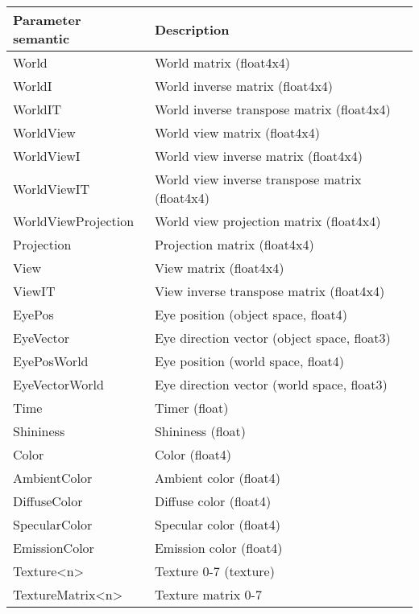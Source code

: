 \begin{tabular}{|p{7cm}|p{7cm}|}
\hline
\textbf{Parameter semantic} & \textbf{Description}\\
\hline
World               & World matrix (float4x4)\\
\hline
WorldI	            & World inverse matrix (float4x4)\\
\hline
WorldIT	            & World inverse transpose matrix (float4x4)\\
\hline
WorldView           & World view matrix (float4x4)\\
\hline
WorldViewI          & World view inverse matrix (float4x4)\\
\hline
WorldViewIT         & World view inverse transpose matrix (float4x4)\\
\hline
WorldViewProjection & World view projection matrix (float4x4)\\
\hline
Projection	        & Projection matrix (float4x4)\\
\hline
View	            & View matrix (float4x4)\\
\hline
ViewIT	            & View inverse transpose matrix (float4x4)\\
\hline
EyePos	            & Eye position (object space, float4)\\
\hline
EyeVector           & Eye direction vector (object space, float3)\\
\hline
EyePosWorld	        & Eye position (world space, float4)\\
\hline
EyeVectorWorld      & Eye direction vector (world space, float3)\\
\hline
Time	            & Timer (float)\\
\hline
Shininess	        & Shininess (float)\\
\hline
Color	            & Color (float4)\\
\hline
AmbientColor        & Ambient color (float4)\\
\hline
DiffuseColor        & Diffuse color (float4)\\
\hline
SpecularColor       & Specular color (float4)\\
\hline
EmissionColor       & Emission color (float4)\\
\hline
Texture<n>          & Texture 0-7 (texture)\\
\hline
TextureMatrix<n>    & Texture matrix 0-7\\
\hline
\end{tabular}
